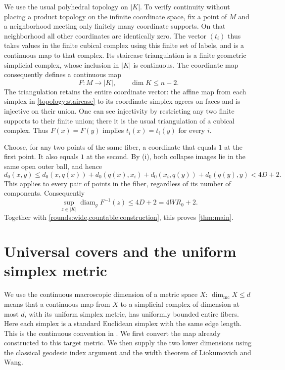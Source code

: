 \documentclass[11pt]{article}
\numberwithin{equation}{section}
\theoremstyle{definition}
\theoremstyle{remark}
\begin{document}
We use the usual polyhedral topology on $|K|$.  To verify continuity
without placing a product topology on the infinite coordinate space,
fix a point of $M$ and a neighborhood meeting only finitely many
coordinate supports.  On that neighborhood all other coordinates
are identically zero.  The vector $(t_i)$ thus takes values in the
finite cubical complex using this finite set of labels, and is a
continuous map to that complex.  Its staircase triangulation is a
finite geometric simplicial complex, whose inclusion in $|K|$ is
continuous.  The coordinate map consequently defines a continuous map
\begin{equation}\label{topology:final-map}
 F:M\longrightarrow |K|,\qquad \dim K\le n-2.
\end{equation}
The triangulation retains the entire coordinate vector: the affine
map from each simplex in \eqref{topology:staircase} to its coordinate
simplex agrees on faces and is injective on their union.  One can see
injectivity by restricting any two finite supports to their finite
union; there it is the usual triangulation of a cubical complex.
Thus $F(x)=F(y)$ implies $t_i(x)=t_i(y)$ for every $i$.

Choose, for any two points of the same fiber, a coordinate that equals
$1$ at the first point.  It also equals $1$ at the second.  By (i), both
collapse images lie in the same open outer ball, and hence
\[
 d_0(x,y)
 \le d_0(x,q(x))+d_0(q(x),x_i)
       +d_0(x_i,q(y))+d_0(q(y),y)
 <4D+2.
\]
This applies to every pair of points in the fiber, regardless of its
number of components.  Consequently
\begin{equation}\label{topology:fiber-bound}
 \sup_{z\in|K|}\operatorname{diam}_{g}F^{-1}(z)\le4D+2=4WR_0+2.
\end{equation}
Together with \cref{rounds:wide,countable:construction}, this proves
\cref{thm:main}.

\section{Universal covers and the uniform simplex metric}
\label{sec:closed-covers}

We use the continuous macroscopic dimension of a metric space $X$:
$\dim_{\mathrm{mc}}X\le d$ means that a continuous map from $X$ to a
simplicial complex of dimension at most $d$, with its uniform simplex
metric, has uniformly bounded entire fibers.  Here each simplex is a
standard Euclidean simplex with the same edge length.  This is the
continuous convention in \citet[Definitions~1.1--1.2]{dranishnikov2014}.
We first convert the map already constructed to this target metric.
We then supply the two lower dimensions using the classical geodesic
index argument and the width theorem of Liokumovich and Wang.
\end{document}
